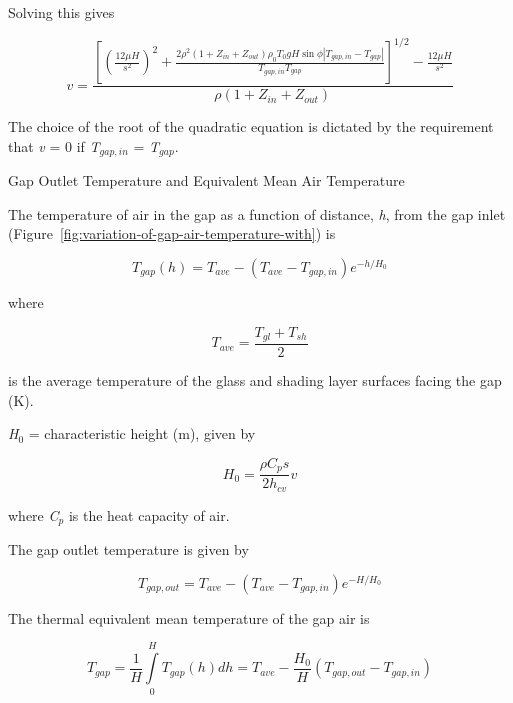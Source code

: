 Solving this gives

\begin{equation}
v = \frac{{{{\left[ {{{\left( {\frac{{12\mu H}}{{{s^2}}}} \right)}^2} + \frac{{2{\rho ^2}(1 + {Z_{in}} + {Z_{out}}){\rho_0}{T_0}gH\sin \phi \left| {{T_{gap,in}} - {T_{gap}}} \right|}}{{{T_{gap,in}}{T_{gap}}}}} \right]}^{1/2}} - \frac{{12\mu H}}{{{s^2}}}}}{{\rho (1 + {Z_{in}} + {Z_{out}})}}
\end{equation}

The choice of the root of the quadratic equation is dictated by the requirement that \emph{v} = 0 if \emph{T\(_{gap,in}\)} = \emph{T\(_{gap}\)}.

Gap Outlet Temperature and Equivalent Mean Air Temperature

The temperature of air in the gap as a function of distance, \emph{h}, from the gap inlet (Figure~\ref{fig:variation-of-gap-air-temperature-with}) is

\begin{equation}
{T_{gap}}(h) = {T_{ave}} - ({T_{ave}} - {T_{gap,in}}){e^{ - h/{H_0}}}
\end{equation}

where

\begin{equation}
{T_{ave}} = \frac{{{T_{gl}} + {T_{sh}}}}{2}
\end{equation}

is the average temperature of the glass and shading layer surfaces facing the gap (K).

\emph{H\(_{0}\)} = characteristic height (m), given by

\begin{equation}
{H_0} = \frac{{\rho {C_p}s}}{{2{h_{cv}}}}v
\end{equation}

where \emph{C\(_{p}\)} is the heat capacity of air.

The gap outlet temperature is given by

\begin{equation}
{T_{gap,out}} = {T_{ave}} - ({T_{ave}} - {T_{gap,in}}){e^{ - H/{H_0}}}
\end{equation}

The thermal equivalent mean temperature of the gap air is

\begin{equation}
{T_{gap}} = \frac{1}{H}\int\limits_0^H {{T_{gap}}(h)dh = {T_{ave}} - \frac{{{H_0}}}{H}} \left( {{T_{gap,out}} - {T_{gap,in}}} \right)
\end{equation}

